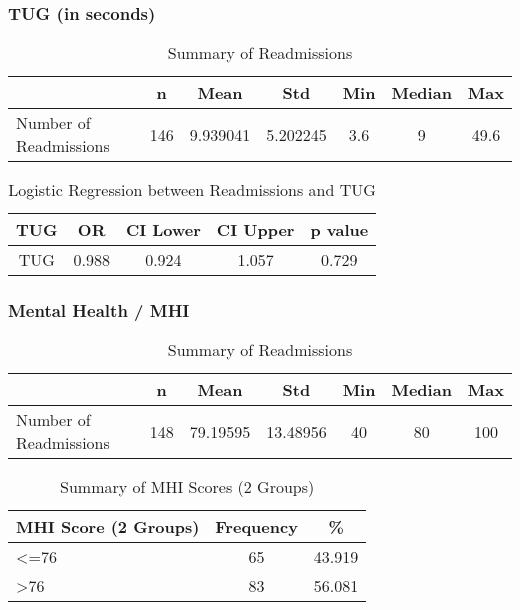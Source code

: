 \documentclass[12pt,]{article}
\begin{document}
\pagebreak

\subsubsection{TUG (in seconds)}\label{tug-in-seconds}

\begin{table}[!h]

\caption{\label{tab:unnamed-chunk-23}Summary of Readmissions}
\centering
\begin{tabular}{>{\raggedright\arraybackslash}p{5cm}cccccc}
\toprule
  & n & Mean & Std & Min & Median & Max\\
\midrule
\rowcolor{white}  Number of Readmissions & 146 & 9.939041 & 5.202245 & 3.6 & 9 & 49.6\\
\bottomrule
\end{tabular}
\end{table}

\begin{table}[!h]

\caption{\label{tab:unnamed-chunk-23}Logistic Regression between Readmissions and TUG}
\centering
\begin{tabular}{ccccc}
\toprule
TUG & OR & CI Lower & CI Upper & p value\\
\midrule
\rowcolor{white}  TUG & 0.988 & 0.924 & 1.057 & 0.729\\
\bottomrule
\end{tabular}
\end{table}

\pagebreak

\subsubsection{Mental Health / MHI}\label{mental-health-mhi}

\begin{table}[!h]

\caption{\label{tab:unnamed-chunk-24}Summary of Readmissions}
\centering
\begin{tabular}{>{\raggedright\arraybackslash}p{5cm}cccccc}
\toprule
  & n & Mean & Std & Min & Median & Max\\
\midrule
\rowcolor{white}  Number of Readmissions & 148 & 79.19595 & 13.48956 & 40 & 80 & 100\\
\bottomrule
\end{tabular}
\end{table}

\begin{table}[!h]

\caption{\label{tab:unnamed-chunk-24}Summary of MHI Scores (2 Groups)}
\centering
\begin{tabular}{>{\centering\arraybackslash}p{5cm}cc}
\toprule
MHI Score (2 Groups) & Frequency & \%\\
\midrule
<=76 & 65 & 43.919\\
\rowcolor[HTML]{E3E5E7}  >76 & 83 & 56.081\\
\bottomrule
\end{tabular}
\end{table}
\end{document}
